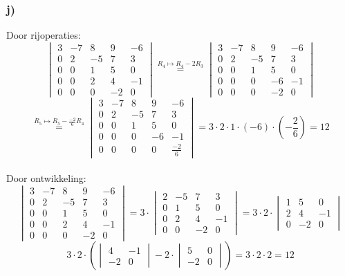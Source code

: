 \documentclass[lineaire_algebra_oplossingen.tex]{subfiles}
\begin{document}
\subsubsection*{j)}
Door rijoperaties:\\
\[
\begin{vmatrix}
3 & -7 & 8 & 9 & -6\\
0 & 2 & -5 & 7 & 3\\
0 & 0 & 1 & 5 & 0\\
0 & 0 & 2 & 4 & -1\\
0 & 0 & 0 & -2 & 0
\end{vmatrix}
\overset{R_4 \longmapsto R_4-2R_3}{=}
\begin{vmatrix}
3 & -7 & 8 & 9 & -6\\
0 & 2 & -5 & 7 & 3\\
0 & 0 & 1 & 5 & 0\\
0 & 0 & 0 & -6 & -1\\
0 & 0 & 0 & -2 & 0
\end{vmatrix}
\]
\[
\overset{R_5 \longmapsto R_5-\frac{-2}{6}R_4}{=}
\begin{vmatrix}
3 & -7 & 8 & 9 & -6\\
0 & 2 & -5 & 7 & 3\\
0 & 0 & 1 & 5 & 0\\
0 & 0 & 0 & -6 & -1\\
0 & 0 & 0 & 0 & \frac{-2}{6}
\end{vmatrix}
=
3\cdot 2 \cdot 1 \cdot (-6) \cdot (-\frac{2}{6}) = 12
\]\\
Door ontwikkeling:
\[
\begin{vmatrix}
3 & -7 & 8 & 9 & -6\\
0 & 2 & -5 & 7 & 3\\
0 & 0 & 1 & 5 & 0\\
0 & 0 & 2 & 4 & -1\\
0 & 0 & 0 & -2 & 0
\end{vmatrix}
=
3 \cdot
\begin{vmatrix}
2 & -5 & 7 & 3\\
0 & 1 & 5 & 0\\
0 & 2 & 4 & -1\\
0 & 0 & -2 & 0
\end{vmatrix}
=
3 \cdot 2 \cdot
\begin{vmatrix}
1 & 5 & 0\\
2 & 4 & -1\\
0 & -2 & 0
\end{vmatrix}
\]
\[
3\cdot 2\cdot \left( 
\begin{vmatrix}
4 & -1\\
-2 & 0
\end{vmatrix}
-2\cdot
\begin{vmatrix}
5 & 0\\
-2 & 0
\end{vmatrix}
\right)
=
3\cdot 2 \cdot 2 = 12
\]
\end{document}
